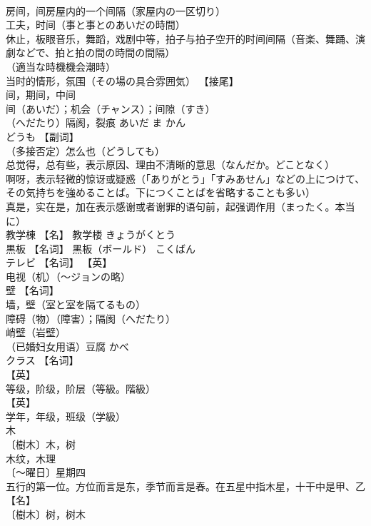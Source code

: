 \documentclass[8pt]{extreport}
\begin{document}
\begin{CJK}{UTF8}{min}
\\	房间，间房屋内的一个间隔（家屋内の一区切り） 
\\	工夫，时间（事と事とのあいだの時間） 
\\	休止，板眼音乐，舞蹈，戏剧中等，拍子与拍子空开的时间间隔（音楽、舞踊、演劇などで、拍と拍の間の時間の間隔） 
\\	（適当な時機機会潮時） 
\\	当时的情形，氛围（その場の具合雰囲気） 【接尾】 
\\	间，期间，中间 
\\	间（あいだ）；机会（チャンス）；间隙（すき） 
\\	（へだたり）隔阂，裂痕	あいだ ま かん	
\\	どうも	【副词】 
\\	（多接否定）怎么也（どうしても） 
\\	总觉得，总有些，表示原因、理由不清晰的意思（なんだか。どことなく） 
\\	啊呀，表示轻微的惊讶或疑惑（「ありがとう」「すみあせん」などの上につけて、その気持ちを強めることば。下につくことばを省略することも多い） 
\\	真是，实在是，加在表示感谢或者谢罪的语句前，起强调作用（まったく。本当に）		
\\	教学棟	【名】 教学楼	きょうがくとう	
\\	黒板	【名词】 黑板（ボールド）	こくばん	
\\	テレビ	【名词】 【英】
\\	电视（机）（～ジョンの略）		
\\	壁	【名词】 
\\	墙，壁（室と室を隔てるもの） 
\\	障碍（物）（障害）；隔阂（へだたり） 
\\	峭壁（岩壁） 
\\	（已婚妇女用语）豆腐	かべ	
\\	クラス	【名词】 
\\	【英】
\\	等级，阶级，阶层（等級。階級） 
\\	【英】
\\	学年，年级，班级（学級）		
\\	木	
\\	〔樹木〕木，树 
\\	木纹，木理 
\\	〔〜曜日〕星期四 
\\	五行的第一位。方位而言是东，季节而言是春。在五星中指木星，十干中是甲、乙 【名】 
\\	〔樹木〕树，树木 

\end{CJK}
\end{document}
